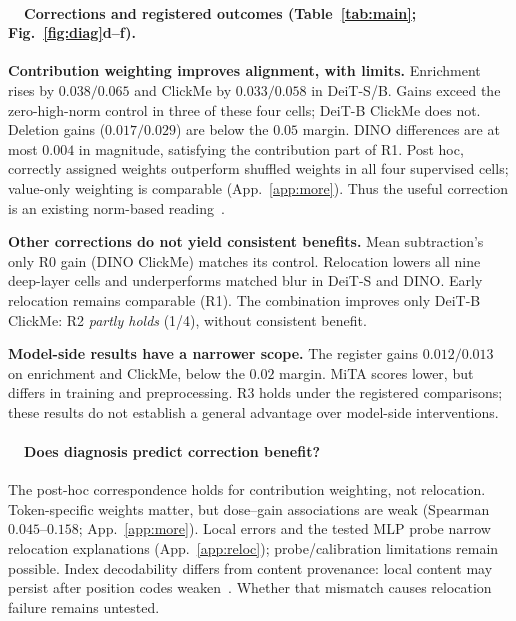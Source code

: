 \documentclass{article}
\newcommand{\rsub}[1]{\refstepcounter{subsection}\paragraph{\thesubsection~~#1}}
\begin{document}
\begin{table}[t]
\caption{Layers 9--12; all metrics $\uparrow$. Arrows: higher/lower versus received attention under the registered rule (model-side rows: DeiT-S). $\diamond$: higher than the matched control. \textbf{Bold}: higher than both. Controls are indented. GAE~\citep{chefer2021generic} uses gradients and is a descriptive reference. Enr.: enrichment; Click.: ClickMe; Del.: deletion.}
\label{tab:main}
\centering\footnotesize
\setlength{\tabcolsep}{2.6pt}\renewcommand{\arraystretch}{1.0}

\end{table}

\rsub{Corrections and registered outcomes (Table~\ref{tab:main}; Fig.~\ref{fig:diag}d--f).}
\textbf{Contribution weighting improves alignment, with limits.} Enrichment rises by $0.038/0.065$ and ClickMe by $0.033/0.058$ in DeiT-S/B. Gains exceed the zero-high-norm control in three of these four cells; DeiT-B ClickMe does not. Deletion gains ($0.017/0.029$) are below the $0.05$ margin. DINO differences are at most $0.004$ in magnitude, satisfying the contribution part of R1. Post hoc, correctly assigned weights outperform shuffled weights in all four supervised cells; value-only weighting is comparable (App.~\ref{app:more}). Thus the useful correction is an existing norm-based reading~\citep{kobayashi2020,zhu2024}.

\begin{samepage}
\smallskip\noindent\textbf{Other corrections do not yield consistent benefits.} Mean subtraction's only R0 gain (DINO ClickMe) matches its control. Relocation lowers all nine deep-layer cells and underperforms matched blur in DeiT-S and DINO. Early relocation remains comparable (R1). The combination improves only DeiT-B ClickMe: R2 \emph{partly holds} (1/4), without consistent benefit.
\par
\end{samepage}

\smallskip\noindent\textbf{Model-side results have a narrower scope.} The register gains $0.012/0.013$ on enrichment and ClickMe, below the $0.02$ margin. MiTA scores lower, but differs in training and preprocessing. R3 holds under the registered comparisons; these results do not establish a general advantage over model-side interventions.

\rsub{Does diagnosis predict correction benefit?} The post-hoc correspondence holds for contribution weighting, not relocation. Token-specific weights matter, but dose--gain associations are weak (Spearman $0.045$--$0.158$; App.~\ref{app:more}). Local errors and the tested MLP probe narrow relocation explanations (App.~\ref{app:reloc}); probe/calibration limitations remain possible. Index decodability differs from content provenance: local content may persist after position codes weaken~\citep{raghu2021}. Whether that mismatch causes relocation failure remains untested.
\end{document}
